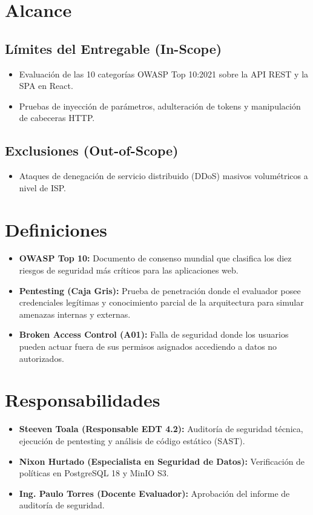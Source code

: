 \documentclass[12pt,a4paper]{article}
\begin{document}
\section{Alcance}
\subsection{Límites del Entregable (In-Scope)}
\begin{itemize}[leftmargin=1.5em, itemsep=2pt]
    \item Evaluación de las 10 categorías OWASP Top 10:2021 sobre la API REST y la SPA en React.
    \item Pruebas de inyección de parámetros, adulteración de tokens y manipulación de cabeceras HTTP.
\end{itemize}
\subsection{Exclusiones (Out-of-Scope)}
\begin{itemize}[leftmargin=1.5em, itemsep=2pt]
    \item Ataques de denegación de servicio distribuido (DDoS) masivos volumétricos a nivel de ISP.
\end{itemize}

\section{Definiciones}
\begin{itemize}[leftmargin=1.5em, itemsep=2pt]
    \item \textbf{OWASP Top 10:} Documento de consenso mundial que clasifica los diez riesgos de seguridad más críticos para las aplicaciones web.
    \item \textbf{Pentesting (Caja Gris):} Prueba de penetración donde el evaluador posee credenciales legítimas y conocimiento parcial de la arquitectura para simular amenazas internas y externas.
    \item \textbf{Broken Access Control (A01):} Falla de seguridad donde los usuarios pueden actuar fuera de sus permisos asignados accediendo a datos no autorizados.
\end{itemize}

\section{Responsabilidades}
\begin{itemize}[leftmargin=1.5em, itemsep=2pt]
    \item \textbf{Steeven Toala (Responsable EDT 4.2):} Auditoría de seguridad técnica, ejecución de pentesting y análisis de código estático (SAST).
    \item \textbf{Nixon Hurtado (Especialista en Seguridad de Datos):} Verificación de políticas en PostgreSQL 18 y MinIO S3.
    \item \textbf{Ing. Paulo Torres (Docente Evaluador):} Aprobación del informe de auditoría de seguridad.
\end{itemize}
\end{document}
